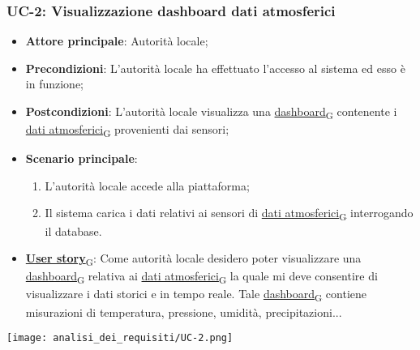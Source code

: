 \subsubsection{UC-2: Visualizzazione dashboard dati atmosferici}
\begin{itemize}
	\item \textbf{Attore principale}: Autorità locale;
	\item \textbf{Precondizioni}: L'autorità locale ha effettuato l'accesso al sistema ed esso è in funzione;
	\item \textbf{Postcondizioni}: L'autorità locale visualizza una \href{https://7last.github.io/docs/rtb/documentazione-interna/glossario\#dashboard}{dashboard\textsubscript{G}} contenente i \href{https://7last.github.io/docs/rtb/documentazione-interna/glossario\#dati-atmosferici}{dati atmosferici\textsubscript{G}} provenienti dai sensori;
	\item \textbf{Scenario principale}:
	      \begin{enumerate}
		      \item L'autorità locale accede alla piattaforma;
		      \item Il sistema carica i dati relativi ai sensori di \href{https://7last.github.io/docs/rtb/documentazione-interna/glossario\#dati-atmosferici}{dati atmosferici\textsubscript{G}} interrogando il database.
	      \end{enumerate}
	\item \href{https://7last.github.io/docs/rtb/documentazione-interna/glossario\#user-story}{\textbf{User story}\textsubscript{G}}: Come autorità locale desidero poter visualizzare una \href{https://7last.github.io/docs/rtb/documentazione-interna/glossario\#dashboard}{dashboard\textsubscript{G}} relativa ai \href{https://7last.github.io/docs/rtb/documentazione-interna/glossario\#dati-atmosferici}{dati atmosferici\textsubscript{G}}
	      la quale mi deve consentire di visualizzare i dati storici e in tempo reale. Tale \href{https://7last.github.io/docs/rtb/documentazione-interna/glossario\#dashboard}{dashboard\textsubscript{G}} contiene misurazioni di temperatura,
	      pressione, umidità, precipitazioni...
\end{itemize}

\begin{center}
	\texttt{[image: analisi\_dei\_requisiti/UC-2.png]}
\end{center}

